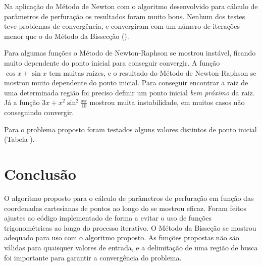 \documentclass[final,3p,12pt]{elsarticle}
\begin{document}
    Na aplicação do Método de Newton com o algoritmo desenvolvido para cálculo de parâmetros de perfuração os resultados foram muito bons. Nenhum dos testes teve problemas de convergência, e convergiram com um número de iterações menor que o do Método da Bissecção ().

    Para algumas funções o Método de Newton-Raphson se mostrou instável, ficando muito dependente do ponto inicial para conseguir convergir. A função $\cos x + \sin x$ tem muitas raízes, e o resultado do Método de Newton-Raphson se mostrou muito dependente do ponto inicial. Para conseguir encontrar a raiz de uma determinada região foi preciso definir um ponto inicial \emph{bem próximo} da raiz. Já a função $3x + x^2 \sin^2 \frac{x\pi}{10}$ mostrou muita instabilidade, em muitos casos não conseguindo convergir.

    Para o problema proposto foram testados alguns valores distintos de ponto inicial (Tabela ).
    
    \section{Conclusão}
    
    O algoritmo proposto para o cálculo de parâmetros de perfuração em função das coordenadas cartesianas de pontos ao longo do se mostrou eficaz. Foram feitos ajustes ao código implementado de forma a evitar o uso de funções trigonométricas ao longo do processo iterativo.
    O Método da Bisseção se mostrou adequado para uso com o algoritmo proposto. As funções propostas não são válidas para quaisquer valores de entrada, e a delimitação de uma região de busca foi importante para garantir a convergência do problema.

    



 


\end{document}
